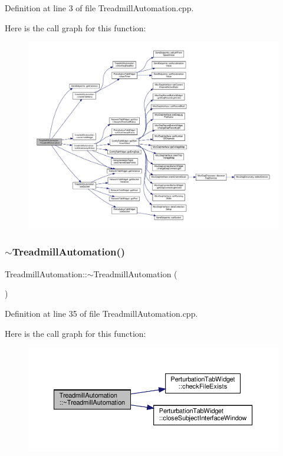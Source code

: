 Definition at line 3 of file Treadmill\+Automation.\+cpp.

Here is the call graph for this function\+:
\nopagebreak
\begin{figure}[H]
\begin{center}
\leavevmode
\includegraphics[width=350pt]{class_treadmill_automation_a6328b65397f5d0553590f363d29ec9b7_cgraph}
\end{center}
\end{figure}
\mbox{\label{class_treadmill_automation_a23106afb1a5f963e4155adce3ce888b0}} 
\subsubsection{\texorpdfstring{$\sim$\+Treadmill\+Automation()}{~TreadmillAutomation()}}
{\footnotesize\ttfamily Treadmill\+Automation\+::$\sim$\+Treadmill\+Automation (\begin{DoxyParamCaption}{ }\end{DoxyParamCaption})}



Definition at line 35 of file Treadmill\+Automation.\+cpp.

Here is the call graph for this function\+:
\nopagebreak
\begin{figure}[H]
\begin{center}
\leavevmode
\includegraphics[width=350pt]{class_treadmill_automation_a23106afb1a5f963e4155adce3ce888b0_cgraph}
\end{center}
\end{figure}


